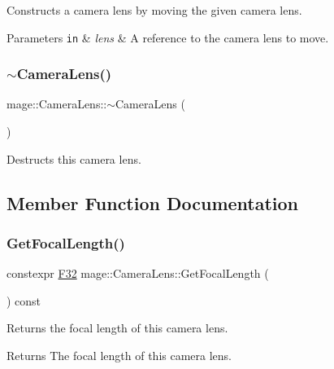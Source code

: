 Constructs a camera lens by moving the given camera lens.


\begin{DoxyParams}[1]{Parameters}
\mbox{\tt in}  & {\em lens} & A reference to the camera lens to move. \\
\hline
\end{DoxyParams}
\hypertarget{classmage_1_1_camera_lens_a3bec59a60d52a0ef90c99fae7e5be5c1}{}\label{classmage_1_1_camera_lens_a3bec59a60d52a0ef90c99fae7e5be5c1} 
\subsubsection{\texorpdfstring{$\sim$\+Camera\+Lens()}{~CameraLens()}}
{\footnotesize\ttfamily mage\+::\+Camera\+Lens\+::$\sim$\+Camera\+Lens (\begin{DoxyParamCaption}{ }\end{DoxyParamCaption})\hspace{0.3cm}{\ttfamily [default]}}

Destructs this camera lens. 

\subsection{Member Function Documentation}
\hypertarget{classmage_1_1_camera_lens_ad28fb2b3ffad0070f0e152e189fd50b6}{}\label{classmage_1_1_camera_lens_ad28fb2b3ffad0070f0e152e189fd50b6} 
\subsubsection{\texorpdfstring{Get\+Focal\+Length()}{GetFocalLength()}}
{\footnotesize\ttfamily constexpr \hyperlink{namespacemage_aa97e833b45f06d60a0a9c4fc22ae02c0}{F32} mage\+::\+Camera\+Lens\+::\+Get\+Focal\+Length (\begin{DoxyParamCaption}{ }\end{DoxyParamCaption}) const\hspace{0.3cm}{\ttfamily [noexcept]}}

Returns the focal length of this camera lens.

\begin{DoxyReturn}{Returns}
The focal length of this camera lens. 
\end{DoxyReturn}
\hypertarget{classmage_1_1_camera_lens_a218641f4d385957669a211fae3702f93}{}\label{classmage_1_1_camera_lens_a218641f4d385957669a211fae3702f93} 

